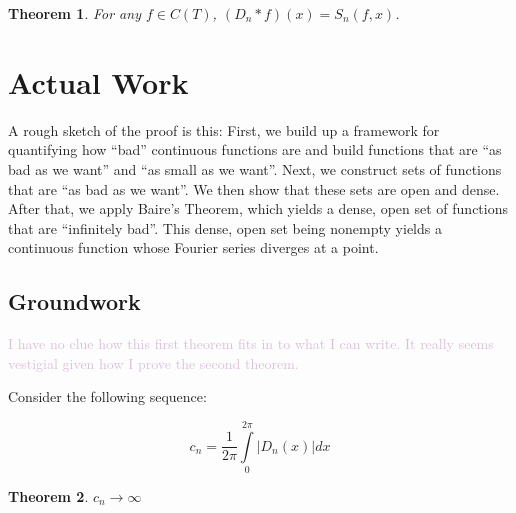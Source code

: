 \documentclass{amsart}
\newcommand{\colorcomment}[2]{\textcolor{#1}{#2}} %
\newcommand{\absval}[1]{\lvert #1 \rvert}
\newtheorem{thm}{Theorem}[section]
\theoremstyle{definition}
\begin{document}
\begin{thm}
For any $f \in C(T)$, $(D_n \ast f)(x) = S_n(f,x)$. 
\end{thm}

\section{Actual Work}


A rough sketch of the proof is this: 
First, we build up a framework for quantifying how ``bad'' continuous functions are and build functions that are ``as bad as we want'' and ``as small as we want''. 
Next, we construct sets of functions that are ``as bad as we want''. 
We then show that these sets are open and dense. 
After that, we apply Baire's Theorem, which yields a dense, open set of functions that are ``infinitely bad''. 
This dense, open set being nonempty yields a continuous function whose Fourier series diverges at a point.

\subsection{Groundwork}

\colorcomment{Thistle}{I have no clue how this first theorem fits in to what I can write. It really seems vestigial given how I prove the second theorem.}

Consider the following sequence:

\begin{displaymath}
c_n = \frac{1}{2 \pi} \int\limits_0^{2\pi} \absval{D_n(x)} dx
\end{displaymath}

\begin{thm}
$c_n \to \infty$
\end{thm}
\end{document}
